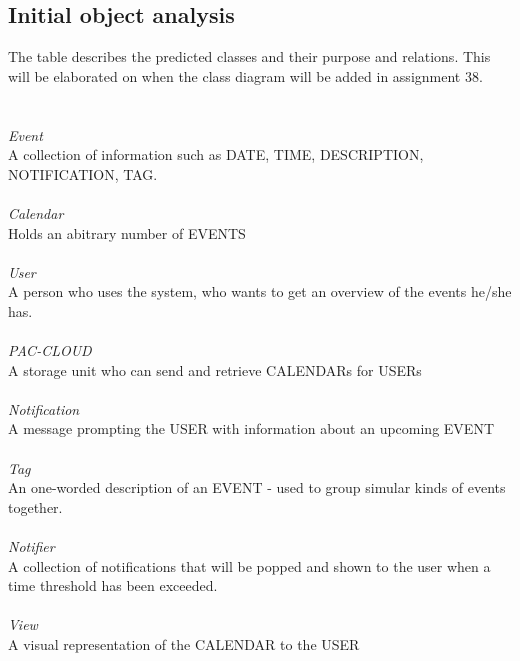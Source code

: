 \subsection{Initial object analysis}
The table describes the predicted classes and their purpose and relations. This will be elaborated on when the class diagram will be added in assignment 38.
\\
\\
\HRule \\[0.4cm]
\emph{Event}\\
A collection of information such as DATE, TIME, DESCRIPTION, NOTIFICATION, TAG.\\
\HRule \\[0.4cm]
\emph{Calendar}\\
Holds an abitrary number of EVENTS\\
\HRule \\[0.4cm]
\emph{User}\\
A person who uses the system, who wants to get an overview of the events he/she has.\\
\HRule \\[0.4cm]
\emph{PAC-CLOUD}\\
A storage unit who can send and retrieve CALENDARs for USERs\\
\HRule \\[0.4cm]
\emph{Notification}\\
A message prompting the USER with information about an upcoming EVENT\\
\HRule \\[0.4cm]
\emph{Tag}\\
An one-worded description of an EVENT - used to group simular kinds of events together.\\
\HRule \\[0.4cm]
\emph{Notifier}\\
A collection of notifications that will be popped and shown to the user when a time threshold has been exceeded.\\
\HRule \\[0.4cm]
\emph{View}\\
A visual representation of the CALENDAR to the USER\\
\HRule \\[0.4cm]

\newpage
